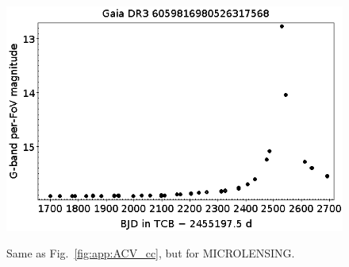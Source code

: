 \documentclass[longauth]{aa}
\begin{document}
\begin{appendix}
\begin{figure}
\hspace{2mm}
 \includegraphics[width=0.45\hsize]{figures/appendix/MICROLENSING-64.png} \\
\vspace{4mm}
 \caption{Same as Fig.~\ref{fig:app:ACV_cc}, but for MICROLENSING.}
 \label{fig:app:MICROLENSING_cc}
\end{figure}




\end{appendix}
\end{document}
